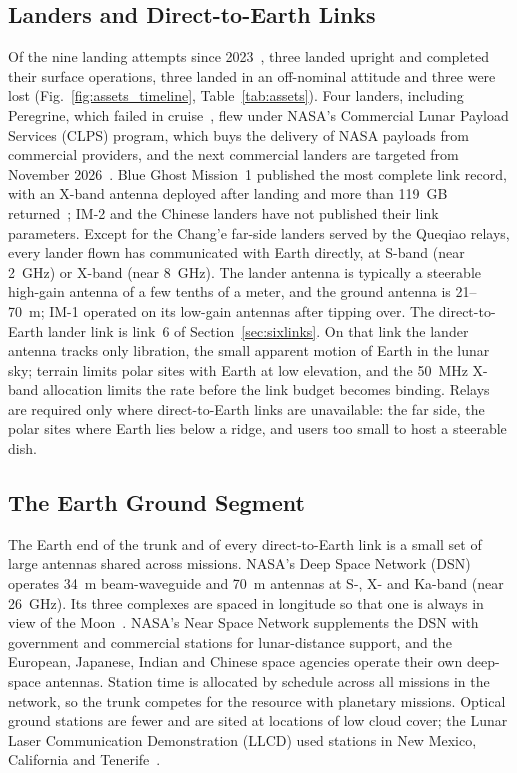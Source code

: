 \documentclass{IEEEoj}
\begin{document}
\subsection{Landers and Direct-to-Earth Links}
\label{sec:landers}
Of the nine landing attempts since 2023~\cite{isro_ch3,li2024ce6,firefly_bgm1,jaxa_slim,nasa_im1,nasa_im2,ispace_m1,luna25_sfn,ispace_m2}, three landed upright and completed their surface operations, three landed in an off-nominal attitude and three were lost (Fig.~\ref{fig:assets_timeline}, Table~\ref{tab:assets}). Four landers, including Peregrine, which failed in cruise~\cite{nssdc_peregrine}, flew under NASA's Commercial Lunar Payload Services (CLPS) program, which buys the delivery of NASA payloads from commercial providers, and the next commercial landers are targeted from November 2026~\cite{brinkmann2026}. Blue Ghost Mission~1 published the most complete link record, with an X-band antenna deployed after landing and more than \SI{119}{GB} returned~\cite{nssdca_bgm1,firefly_bgm1_14days2025}; IM-2 and the Chinese landers have not published their link parameters.
Except for the Chang'e far-side landers served by the Queqiao relays, every lander flown has communicated with Earth directly, at S-band (near \SI{2}{GHz}) or X-band (near \SI{8}{GHz}). The lander antenna is typically a steerable high-gain antenna of a few tenths of a meter, and the ground antenna is \SI{21}{}--\SI{70}{m}; IM-1 operated on its low-gain antennas after tipping over. The direct-to-Earth lander link is link~6 of Section~\ref{sec:sixlinks}. On that link the lander antenna tracks only libration, the small apparent motion of Earth in the lunar sky; terrain limits polar sites with Earth at low elevation, and the \SI{50}{MHz} X-band allocation limits the rate before the link budget becomes binding. Relays are required only where direct-to-Earth links are unavailable: the far side, the polar sites where Earth lies below a ridge, and users too small to host a steerable dish.

\subsection{The Earth Ground Segment}
\label{sec:ground}
The Earth end of the trunk and of every direct-to-Earth link is a small set of large antennas shared across missions. NASA's Deep Space Network (DSN) operates \SI{34}{m} beam-waveguide and \SI{70}{m} antennas at S-, X- and Ka-band (near \SI{26}{GHz}). Its three complexes are spaced in longitude so that one is always in view of the Moon~\cite{dsn_810_005}. NASA's Near Space Network supplements the DSN with government and commercial stations for lunar-distance support, and the European, Japanese, Indian and Chinese space agencies operate their own deep-space antennas. Station time is allocated by schedule across all missions in the network, so the trunk competes for the resource with planetary missions. Optical ground stations are fewer and are sited at locations of low cloud cover; the Lunar Laser Communication Demonstration (LLCD) used stations in New Mexico, California and Tenerife~\cite{boroson_llcd,giggenbach_locl}.
\end{document}
